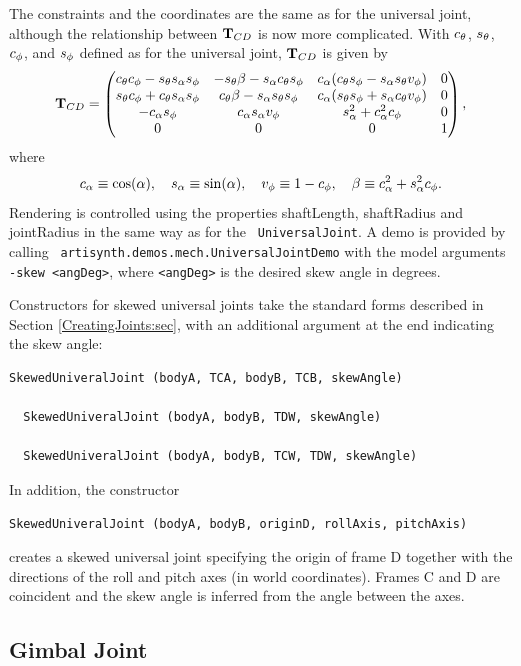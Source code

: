 The constraints and the coordinates are the same as for the universal
joint, although the relationship between ${\bf T}_{CD}$ is now more complicated.
With $c_\theta$, $s_\theta$, $c_\phi$, and $s_\phi$ defined as for the universal
joint, ${\bf T}_{CD}$ is given by
%
\begin{equation*}
{\bf T}_{CD} = \left(\begin{matrix}
c_\theta c_\phi - s_\theta s_{\alpha}s_\phi & -s_\theta\beta - s_{\alpha}c_\theta s_\phi & c_{\alpha}(c_\theta s_\phi - s_{\alpha}s_\theta v_{\phi}) & 0 \\
s_\theta c_\phi + c_\theta s_{\alpha}s_\phi & c_\theta\beta - s_{\alpha}s_\theta s_\phi  & c_{\alpha}(s_\theta s_\phi + s_{\alpha}c_\theta v_{\phi}) & 0 \\
-c_{\alpha} s_\phi           & c_{\alpha}s_{\alpha}v_{\phi}             &  s_{\alpha}^2 + c_{\alpha}^2c_\phi       & 0 \\
0 & 0 & 0 & 1 
\end{matrix}\right),
\end{equation*}
where 
%
\begin{equation*}
c_{\alpha} \equiv \cos(\alpha), \quad
s_{\alpha} \equiv \sin(\alpha), \quad
v_{\phi} \equiv 1 - c_\phi, \quad \beta \equiv c_{\alpha}^2 + s_{\alpha}^2 c_\phi.
\end{equation*}
%
Rendering is controlled using the properties {\sf shaftLength}, {\sf
shaftRadius} and {\sf jointRadius} in the same way as for the {\tt
UniversalJoint}.  A demo is provided by calling {\tt
artisynth.demos.mech.UniversalJointDemo} with the model arguments {\tt
-skew <angDeg>}, where {\tt <angDeg>} is the desired skew angle in
degrees.

Constructors for skewed universal joints take the standard forms
described in Section \ref{CreatingJoints:sec}, with an additional
argument at the end indicating the skew angle:
%
\begin{lstlisting}[]
  SkewedUniveralJoint (bodyA, TCA, bodyB, TCB, skewAngle)

  SkewedUniveralJoint (bodyA, bodyB, TDW, skewAngle)

  SkewedUniveralJoint (bodyA, bodyB, TCW, TDW, skewAngle)
\end{lstlisting}
%
In addition, the constructor
%
\begin{lstlisting}[]
  SkewedUniveralJoint (bodyA, bodyB, originD, rollAxis, pitchAxis)
\end{lstlisting}
%
creates a skewed universal joint specifying the origin of frame D
together with the directions of the roll and pitch axes (in world
coordinates). Frames C and D are coincident and the skew angle is
inferred from the angle between the axes.

\subsection{Gimbal Joint}


